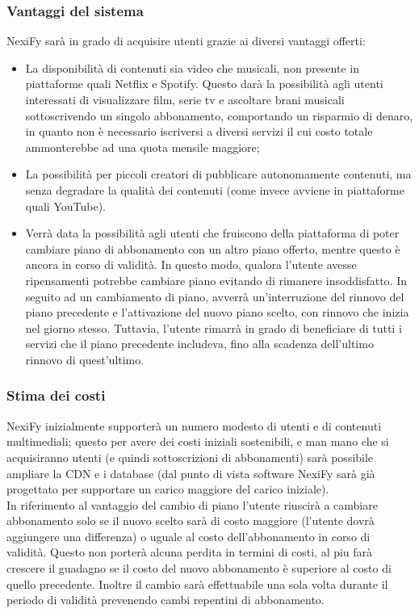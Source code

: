 \subsubsection{Vantaggi del sistema}

NexiFy sarà in grado di acquisire utenti grazie ai diversi vantaggi offerti:
    \begin{itemize}
       	\item La disponibilità di contenuti sia video che musicali, non presente in piattaforme quali Netflix e Spotify. Questo darà la possibilità agli utenti interessati di visualizzare film, serie tv e ascoltare brani musicali sottoscrivendo un singolo abbonamento, comportando un risparmio di denaro, in quanto non è necessario iscriversi a diversi servizi il cui costo totale ammonterebbe ad una quota mensile maggiore;
        	\item La possibilità per piccoli creatori di pubblicare autonomamente contenuti, ma senza degradare la qualità dei contenuti (come invece avviene in piattaforme quali YouTube).
	\item\label{VantaggioSistema_cambioPiano} Verrà data la possibilità agli utenti che fruiscono della
	piattaforma di poter cambiare piano di abbonamento con un altro piano
	offerto, mentre questo è ancora in corso di validità.
	In questo modo, qualora l'utente avesse ripensamenti potrebbe cambiare piano evitando di rimanere insoddisfatto.
	In seguito ad un cambiamento di piano, avverrà un'interruzione del rinnovo del piano
	precedente e l'attivazione del nuovo piano scelto, con rinnovo che inizia nel giorno stesso. Tuttavia,
	l'utente rimarrà in grado di beneficiare di tutti i servizi che il piano precedente includeva, fino alla scadenza
	dell'ultimo rinnovo di quest'ultimo.
	\end{itemize}
\subsubsection{Stima dei costi}

NexiFy inizialmente supporterà un numero modesto di utenti e di contenuti multimediali; questo per avere dei costi iniziali sostenibili, e man mano che si acquisiranno utenti (e quindi sottoscrizioni di abbonamenti) sarà possibile ampliare la CDN e i database (dal punto di vista software NexiFy sarà già progettato per supportare un carico maggiore del carico iniziale).\\
In riferimento al vantaggio del cambio di piano l'utente riuscirà a cambiare abbonamento solo se il nuovo scelto sarà di costo maggiore (l'utente dovrà aggiungere una differenza) o uguale al costo dell'abbonamento in corso di validità. Questo non porterà alcuna perdita in termini di costi, al piu farà crescere il guadagno se il costo del nuovo abbonamento è superiore al costo di quello precedente. Inoltre il cambio sarà effettuabile una sola volta durante il periodo di validità prevenendo cambi repentini di abbonamento.

